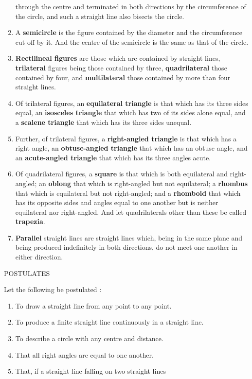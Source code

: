 \begin{displayquote}
\begin{enumerate}
through the centre and terminated in both directions by the
circumference of the circle, and such a straight line also
bisects the circle.
\item A \textbf{semicircle} is the figure contained by the diameter
and the circumference cut off by it. And the centre of the
semicircle is the same as that of the circle.
\item \textbf{Rectilineal figures} are those which are contained
by straight lines, \textbf{trilateral} figures being those contained by
three, \textbf{quadrilateral} those contained by four, and \textbf{multilateral}
those contained by more than four straight lines.
\item Of trilateral figures, an \textbf{equilateral triangle} is that
which has its three sides equal, an \textbf{isosceles triangle} that
which has two of its sides alone equal, and a \textbf{scalene
triangle} that which has its three sides unequal.
\item Further, of trilateral figures, a \textbf{right-angled triangle}
is that which has a right angle, an \textbf{obtuse-angled
triangle} that which has an obtuse angle, and an \textbf{acute-angled
triangle} that which has its three angles acute.
\item Of quadrilateral figures, a \textbf{square} is that which is
both equilateral and right-angled; an \textbf{oblong} that which is
right-angled but not equilateral; a \textbf{rhombus} that which is
equilateral but not right-angled; and a \textbf{rhomboid} that which
has its opposite sides and angles equal to one another but is
neither equilateral nor right-angled. And let quadrilaterals
other than these be called \textbf{trapezia}.
\item \textbf{Parallel} straight lines are straight lines which,
being in the same plane and being produced indefinitely in
both directions, do not meet one another in either direction.
\end{enumerate}
{\centering POSTULATES\par}
Let the following be postulated :
\begin{enumerate}
\item To draw a straight line from any point to any point.
\item To produce a finite straight line continuously in a
straight line.
\item To describe a circle with any centre and distance.
\item That all right angles are equal to one another.
\item That, if a straight line falling on two straight lines

\end{enumerate}
\end{displayquote}
